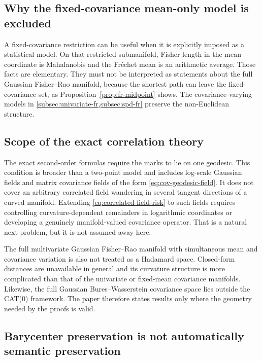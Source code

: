 \documentclass[11pt,a4paper]{article}
\theoremstyle{remark}
\begin{document}
\subsection{Why the fixed-covariance mean-only model is excluded}

A fixed-covariance restriction can be useful when it is explicitly imposed as a statistical model.  On that restricted submanifold, Fisher length in the mean coordinate is Mahalanobis and the Fr\'echet mean is an arithmetic average.  Those facts are elementary.  They must not be interpreted as statements about the full Gaussian Fisher--Rao manifold, because the shortest path can leave the fixed-covariance set, as Proposition~\ref{prop:fr-midpoint} shows.  The covariance-varying models in \cref{subsec:univariate-fr,subsec:spd-fr} preserve the non-Euclidean structure.

\subsection{Scope of the exact correlation theory}

The exact second-order formulas require the marks to lie on one geodesic.  This condition is broader than a two-point model and includes log-scale Gaussian fields and matrix covariance fields of the form \eqref{eq:cov-geodesic-field}.  It does not cover an arbitrary correlated field wandering in several tangent directions of a curved manifold.  Extending \eqref{eq:correlated-field-risk} to such fields requires controlling curvature-dependent remainders in logarithmic coordinates or developing a genuinely manifold-valued covariance operator.  That is a natural next problem, but it is not assumed away here.

The full multivariate Gaussian Fisher--Rao manifold with simultaneous mean and covariance variation is also not treated as a Hadamard space.  Closed-form distances are unavailable in general and its curvature structure is more complicated than that of the univariate or fixed-mean covariance manifolds.  Likewise, the full Gaussian Bures--Wasserstein covariance space lies outside the CAT(0) framework.  The paper therefore states results only where the geometry needed by the proofs is valid.

\subsection{Barycenter preservation is not automatically semantic preservation}
\end{document}
